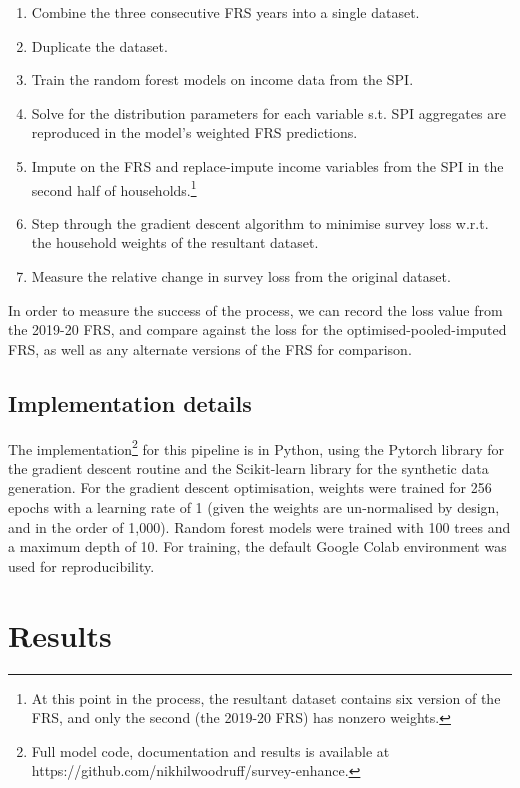 \documentclass[10pt,journal,compsoc]{IEEEtran}
\begin{document}
\begin{enumerate}
  \item Combine the three consecutive FRS years into a single dataset.
  \item Duplicate the dataset.
  \item Train the random forest models on income data from the SPI.
  \item Solve for the distribution parameters for each variable s.t. SPI aggregates are reproduced in the model's weighted FRS predictions.
  \item Impute on the FRS and replace-impute income variables from the SPI in the second half of households.\footnote{At this point in the process, the resultant dataset contains six version of the FRS, and only the second (the 2019-20 FRS) has nonzero weights.}
  \item Step through the gradient descent algorithm to minimise survey loss w.r.t. the household weights of the resultant dataset.
  \item Measure the relative change in survey loss from the original dataset.
\end{enumerate}

In order to measure the success of the process, we can record the loss value from the 2019-20 FRS, and compare against the loss for the optimised-pooled-imputed FRS, as well as any alternate versions of the FRS for comparison. 

\subsection{Implementation details}

The implementation\footnote{Full model code, documentation and results is available at https://github.com/nikhilwoodruff/survey-enhance.} for this pipeline is in Python, using the Pytorch library for the gradient descent routine and the Scikit-learn library for the synthetic data generation. For the gradient descent optimisation, weights were trained for 256 epochs with a learning rate of 1 (given the weights are un-normalised by design, and in the order of 1,000). Random forest models were trained with 100 trees and a maximum depth of 10. For training, the default Google Colab environment was used for reproducibility.

\section{Results}
\end{document}
